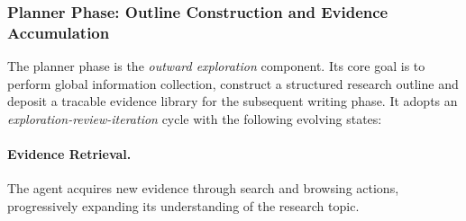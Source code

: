 \documentclass{huawei}
\begin{document}

\subsubsection{Planner Phase: Outline Construction and Evidence Accumulation}
The planner phase is the \textit{outward exploration} component. Its core goal is to perform global information collection, construct a structured research outline and deposit a tracable evidence library for the subsequent writing phase. It adopts an \textit{exploration-review-iteration} cycle with the following evolving states: 

\paragraph{Evidence Retrieval.} The agent acquires new evidence through search and browsing actions, progressively expanding its understanding of the research topic.
\end{document}
